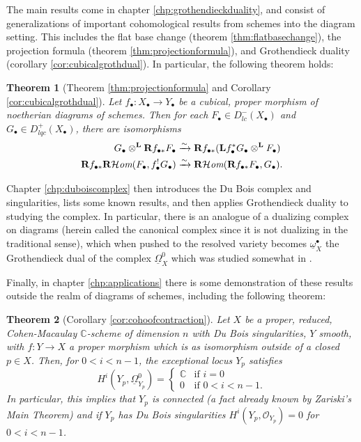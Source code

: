 \documentclass[proquest]{uwthesis}[2014/11/13]
\newtheorem{theorem}{Theorem}[section]
\theoremstyle{definition}
\newcommand{\cHom}{\mathcal{H} \textit{om}}
\newcommand{\CC}{\mathbb{C}}
\newcommand{\bL}{\textbf{L}}
\newcommand{\OO}{\mathcal{O}}
\newcommand{\bR}{\textbf{R}}
\newcommand{\otimesL}{\otimes^{\bf L}}
\newcommand{\DB}{\underline{\Omega}}
\newcommand{\db}{\underline{\omega}^\bullet}
\begin{document}
The main results come in chapter \ref{chp:grothendieckduality}, and consist of generalizations of important cohomological results from schemes into the diagram setting. This includes the flat base change (theorem \ref{thm:flatbasechange}), the projection formula (theorem \ref{thm:projectionformula}), and Grothendieck duality (corollary \ref{cor:cubicalgrothdual}). In particular, the following theorem holds:

\begin{theorem}[Theorem \ref{thm:projectionformula} and Corollary \ref{cor:cubicalgrothdual}]
	Let $f_\bullet : X_\bullet \rightarrow Y_\bullet$ be a cubical, proper morphism of noetherian diagrams of schemes.
	Then for each $F_\bullet \in D_{lc}^-(X_\bullet)$ and $G_\bullet \in D_{lqc}^+(X_\bullet)$, there are isomorphisms
	\begin{align*}
	G_\bullet \otimesL \bR f_{\bullet *} F_\bullet &\xrightarrow{\sim} \bR f_{\bullet *}(\bL f_\bullet^* G_\bullet \otimesL F_\bullet) \\
	\bR f_{\bullet *} \bR \cHom(F_\bullet, f_\bullet^! G_\bullet) &\xrightarrow{\sim} \bR \cHom(\bR f_{\bullet *} F_\bullet, G_\bullet).
	\end{align*}
\end{theorem}

Chapter \ref{chp:duboiscomplex} then introduces the Du Bois complex and singularities, lists some known results, and then applies Grothendieck duality to studying the complex.
In particular, there is an analogue of a dualizing complex on diagrams (herein called the canonical complex since it is not dualizing in the traditional sense), which when pushed to the resolved variety becomes $\db_X$ the Grothendieck dual of the complex $\DB_X^0$ which was studied somewhat in \cite{Kovacs2011a}.

Finally, in chapter \ref{chp:applications} there is some demonstration of these results outside the realm of diagrams of schemes, including the following theorem:
\begin{theorem}[Corollary \ref{cor:cohoofcontraction}]
	Let $X$ be a proper, reduced, Cohen-Macaulay $\CC$-scheme of dimension $n$ with Du Bois singularities, $Y$ smooth, with $f : Y \rightarrow X$ a proper morphism which is as isomorphism outside of a closed $p \in X$.
	Then, for $0 < i < n - 1$, the exceptional locus $Y_p$ satisfies
	\[
	H^i (Y_p, \DB_{Y_p}^0) = \begin{cases}
	\CC & \text{if } i = 0 \\
	0 & \text{if } 0 < i < n - 1.
	\end{cases}
	\]
	In particular, this implies that $Y_p$ is connected (a fact already known by Zariski's Main Theorem) and if $Y_p$ has Du Bois singularities $H^i(Y_p, \OO_{Y_p}) = 0$ for $0 < i < n - 1$.
\end{theorem}
\end{document}
